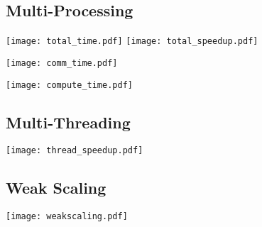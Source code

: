 \subsection*{Multi-Processing}

\texttt{[image: total\_time.pdf]}
\texttt{[image: total\_speedup.pdf]}

\texttt{[image: comm\_time.pdf]}

\texttt{[image: compute\_time.pdf]}



\subsection*{Multi-Threading}
\texttt{[image: thread\_speedup.pdf]}

\subsection*{Weak Scaling}
\texttt{[image: weakscaling.pdf]}
